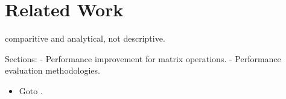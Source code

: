\documentclass[\main/thesis.tex]{subfiles}
\begin{document}
\chapter{Related Work}
\label{cha:related}

comparitive and analytical, not descriptive.

Sections:
  - Performance improvement for matrix operations.
  - Performance evaluation methodologies.

\begin{itemize}
  \item Goto \autocite{goto2008anatomy}.
\end{itemize}
\end{document}
